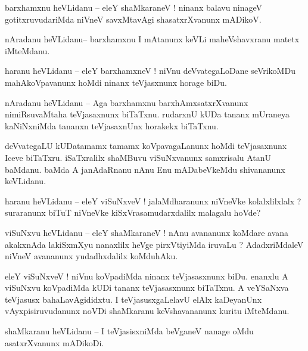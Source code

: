 \documentclass{article}
\begin{document}
\begin{mn}%
barxhamxnu heVLidanu -- eleY shaMkaraneV ! ninanx balavu ninageV gotitxruvudariMda niVneV 
savxMtavAgi shasatxrXvanunx mADikoV.
\end{mn}

\begin{mn}%
nAradanu heVLidanu-- barxhamxnu I mAtanunx keVLi maheVshavxranu matetx iMteMdanu.
\end{mn}

\begin{mn}%
haranu heVLidanu -- eleY barxhamxneV ! niVnu deVvategaLoDane seVrikoMDu mahAkoVpavanunx 
hoMdi ninanx teVjasxnunx horage biDu.
\end{mn}

\begin{mn}%
nAradanu heVLidanu -- Aga barxhamxnu barxhAmxsatxrXvanunx nimiRsuvaMtaha teVjasaxnunx biTaTxnu.
rudarxnU kUDa tananx mUraneya kaNiNxniMda tananxn teVjasaxnUnx horakekx biTaTxnu.
\end{mn}

\begin{mn}%
deVvategaLU kUDatamamx tamamx koVpavagaLanunx hoMdi teVjasaxnunx Iceve biTaTxru. iSaTxralilx 
shaMBuvu viSuNxvanunx samxrisalu AtanU baMdanu. baMda A janAdaRnanu nAnu Enu mADabeVkeMdu 
shivananunx keVLidanu.
\end{mn}

\begin{mn}%
haranu heVLidanu -- eleY viSuNxveV ! jalaMdharanunx niVneVke kolalxlilxlalx ? suraranunx 
biTuT niVneVke kiSxVrasamudarxdalilx malagalu hoVde? 
\end{mn}

\begin{mn}%
viSuNxvu heVLidanu -- eleY shaMkaraneV ! nAnu avananunx koMdare avana akakxnAda lakiSxmXyu 
nanaxlilx heVge pirxVtiyiMda iruvaLu ?   AdadxriMdaleV niVneV avananunx yudadhxdalilx 
koMduhAku.
\end{mn}

\begin{mn}%
eleY viSuNxveV ! niVnu koVpadiMda ninanx teVjasasxnunx biDu. enanxlu A viSuNxvu koVpadiMda 
kUDi tananx teVjasasxnunx biTaTxnu. A veYSaNxva teVjasusx bahaLavAgididxtu. I 
teVjasusxgaLelavU elAlx kaDeyanUnx vAyxpisiruvudanunx noVDi shaMkaranu keVshavananunx 
kuritu iMteMdanu.
\end{mn}

\begin{mn}%
shaMkaranu heVLidanu -- I teVjasisxniMda beVganeV nanage oMdu asatxrXvanunx mADikoDi.
\end{mn}
\end{document}
